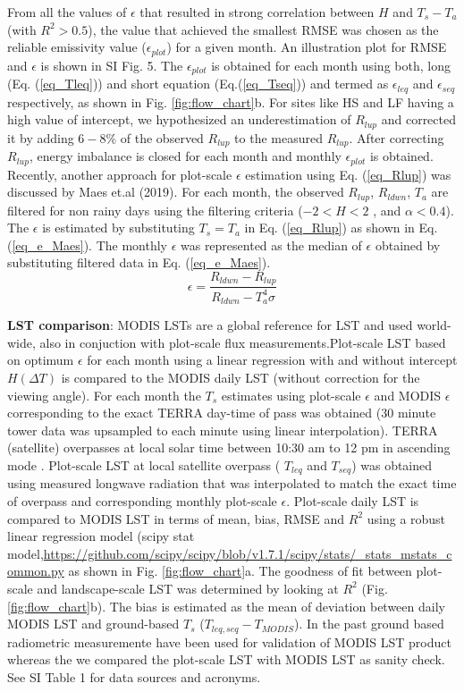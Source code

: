 \documentclass[fleqn,10pt]{wlscirep}
\begin{document}
From all the values of $\epsilon$ that resulted in strong correlation between $H$ and $T_{s}-T_{a}$ (with $R^{2}>0.5$), the value that achieved the smallest RMSE was chosen as the reliable emissivity value ($\epsilon_{plot}$) for a given month. An illustration plot for RMSE and $\epsilon$ is shown in SI Fig. 5. The $\epsilon_{plot}$ is obtained for each month using both, long (Eq. (\ref{eq_Tleq})) and short equation (Eq.(\ref{eq_Tseq})) and termed as $\epsilon_{leq}$ and $\epsilon_{seq}$ respectively, as shown in Fig. \ref{fig:flow_chart}b. For sites like HS and LF having a high value of intercept, we hypothesized an underestimation of $R_{lup}$ and corrected it by adding $6-8\%$ of the observed $R_{lup}$ to the measured $R_{lup}$. After correcting $R_{lup}$, energy imbalance is closed for each month and monthly $\epsilon_{plot}$ is obtained. 
Recently, another approach for plot-scale $\epsilon$ estimation using Eq. (\ref{eq_Rlup}) was discussed by Maes et.al (2019)\cite{maes2019potential}. For each month, the observed $R_{lup}$,  $R_{ldwn}$, $T_{a}$  are filtered for non rainy days using the filtering criteria ($-2 < H <2$ , and $\alpha < 0.4$). The $\epsilon$ is estimated by substituting $T_{s} = T_{a}$ in Eq. (\ref{eq_Rlup}) as shown in Eq. (\ref{eq_e_Maes}). The monthly $\epsilon$  was represented as the median of $\epsilon$ obtained by substituting filtered data in Eq. (\ref{eq_e_Maes}). 
\begin{equation}\label{eq_e_Maes}
\epsilon = \frac{R_{ldwn} - R_{lup}}{R_{ldwn} - T_{a}^{4} \sigma}
\end{equation}

\textbf{LST comparison}: MODIS LSTs are a global reference for LST and used world-wide, also in conjuction with plot-scale flux measurements.Plot-scale LST based on optimum $\epsilon$ for each month using a linear regression with and without intercept $H(\Delta T)$ is compared to the MODIS daily LST (without correction for the viewing angle). For each month the $T_{s}$ estimates using plot-scale $\epsilon$ and MODIS $\epsilon$ corresponding to the exact TERRA day-time of pass was obtained (30 minute tower data was upsampled to each minute using linear interpolation). TERRA (satellite) overpasses at local solar time between 10:30 am to 12 pm in ascending mode \cite{guillevic2017land}. Plot-scale LST at local satellite overpass ( $T_{leq}$ and $T_{seq}$) was obtained using measured longwave radiation that was interpolated to match the exact time of overpass and corresponding monthly plot-scale $\epsilon$. Plot-scale daily LST is compared to MODIS LST in terms of mean, bias, RMSE and $R^2$ using a robust linear regression model (scipy stat model,\url{https://github.com/scipy/scipy/blob/v1.7.1/scipy/stats/_stats_mstats_common.py} 
 as shown in Fig. \ref{fig:flow_chart}a. The goodness of fit between plot-scale and landscape-scale LST was determined by looking at $R^2$ (Fig. \ref{fig:flow_chart}b). The bias is estimated as the mean of deviation between daily MODIS LST and ground-based $T_{s}$ ($T_{leq,seq} - T_{MODIS}$). In the past ground based radiometric measuremente have been used for validation of MODIS LST product \cite{wang2008validating} whereas the we compared the plot-scale LST with MODIS LST as sanity check. See SI Table 1 for data sources and acronyms.
 
\end{document}

